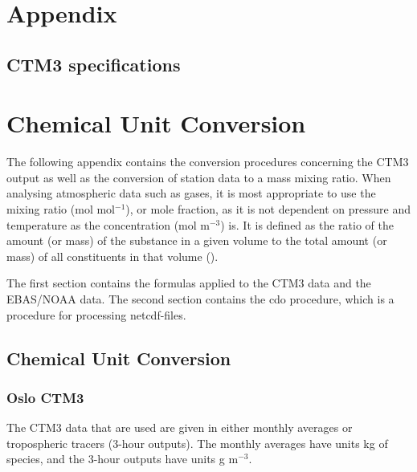 \appendix
\chapter{Appendix}

\section{CTM3 specifications}\label{app:CTM3}







\cleardoublepage

\chapter{Chemical Unit Conversion}

The following appendix contains the conversion procedures concerning the CTM3 output as well as the conversion of station data to a mass mixing ratio. When analysing atmospheric data such as gases, it is most appropriate to use the mixing ratio (mol mol$^{-1}$), or mole fraction, as it is not dependent on pressure and temperature as the concentration (mol m$^{-3}$) is. It is defined as the ratio of the amount (or mass) of the substance in a given volume to the total amount (or mass) of all constituents in that volume (\cite{SeinfeldSpyros}). 

\medskip

The first section contains the formulas applied to the CTM3 data and the EBAS/NOAA data. The second section contains the \acrfull{cdo} procedure, which is a procedure for processing \acrshort{netcdf}-files. 

\section{Chemical Unit Conversion}

\subsection{Oslo CTM3}\label{sec:unit_conversion_CTM3}

The CTM3 data that are used are given in either monthly averages or tropospheric tracers (3-hour outputs). The monthly averages have units kg of species, and the 3-hour outputs have units g m$^{-3}$. 

\medskip

